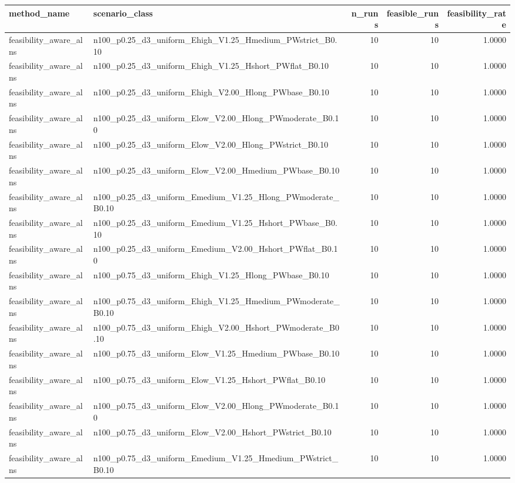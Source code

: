 \begin{tabular}{llrrr}
\toprule
method_name & scenario_class & n_runs & feasible_runs & feasibility_rate \\
\midrule
feasibility_aware_alns & n100_p0.25_d3_uniform_Ehigh_V1.25_Hmedium_PWstrict_B0.10 & 10 & 10 & 1.0000 \\
feasibility_aware_alns & n100_p0.25_d3_uniform_Ehigh_V1.25_Hshort_PWflat_B0.10 & 10 & 10 & 1.0000 \\
feasibility_aware_alns & n100_p0.25_d3_uniform_Ehigh_V2.00_Hlong_PWbase_B0.10 & 10 & 10 & 1.0000 \\
feasibility_aware_alns & n100_p0.25_d3_uniform_Elow_V2.00_Hlong_PWmoderate_B0.10 & 10 & 10 & 1.0000 \\
feasibility_aware_alns & n100_p0.25_d3_uniform_Elow_V2.00_Hlong_PWstrict_B0.10 & 10 & 10 & 1.0000 \\
feasibility_aware_alns & n100_p0.25_d3_uniform_Elow_V2.00_Hmedium_PWbase_B0.10 & 10 & 10 & 1.0000 \\
feasibility_aware_alns & n100_p0.25_d3_uniform_Emedium_V1.25_Hlong_PWmoderate_B0.10 & 10 & 10 & 1.0000 \\
feasibility_aware_alns & n100_p0.25_d3_uniform_Emedium_V1.25_Hshort_PWbase_B0.10 & 10 & 10 & 1.0000 \\
feasibility_aware_alns & n100_p0.25_d3_uniform_Emedium_V2.00_Hshort_PWflat_B0.10 & 10 & 10 & 1.0000 \\
feasibility_aware_alns & n100_p0.75_d3_uniform_Ehigh_V1.25_Hlong_PWbase_B0.10 & 10 & 10 & 1.0000 \\
feasibility_aware_alns & n100_p0.75_d3_uniform_Ehigh_V1.25_Hmedium_PWmoderate_B0.10 & 10 & 10 & 1.0000 \\
feasibility_aware_alns & n100_p0.75_d3_uniform_Ehigh_V2.00_Hshort_PWmoderate_B0.10 & 10 & 10 & 1.0000 \\
feasibility_aware_alns & n100_p0.75_d3_uniform_Elow_V1.25_Hmedium_PWbase_B0.10 & 10 & 10 & 1.0000 \\
feasibility_aware_alns & n100_p0.75_d3_uniform_Elow_V1.25_Hshort_PWflat_B0.10 & 10 & 10 & 1.0000 \\
feasibility_aware_alns & n100_p0.75_d3_uniform_Elow_V2.00_Hlong_PWmoderate_B0.10 & 10 & 10 & 1.0000 \\
feasibility_aware_alns & n100_p0.75_d3_uniform_Elow_V2.00_Hshort_PWstrict_B0.10 & 10 & 10 & 1.0000 \\
feasibility_aware_alns & n100_p0.75_d3_uniform_Emedium_V1.25_Hmedium_PWstrict_B0.10 & 10 & 10 & 1.0000 \\

\end{tabular}
